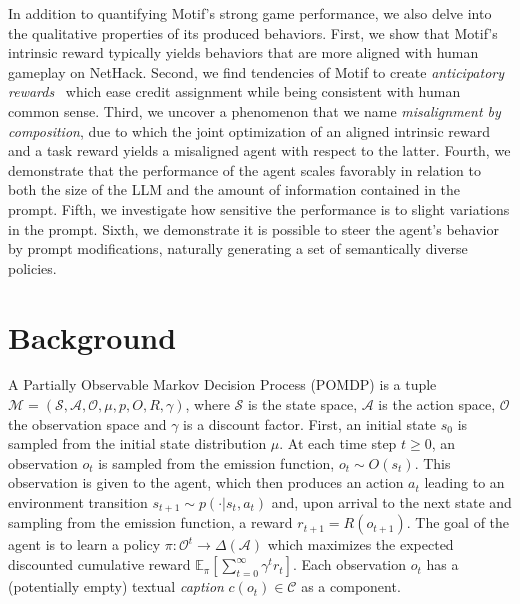 \documentclass{article} %
\begin{document}
In addition to quantifying Motif's strong game performance,
we also delve into the qualitative properties of its produced behaviors.
First, we show that Motif's intrinsic reward typically yields behaviors that are more aligned with human gameplay on NetHack.
Second, we find tendencies of Motif to create \emph{anticipatory rewards}~\citep{thomaz2006reinforcement,Pezzulo2008} which ease credit assignment while being consistent with human common sense.
Third, we uncover a phenomenon that we name \emph{misalignment by composition}, due to which the joint optimization of an aligned intrinsic reward and a task reward yields a misaligned agent with respect to the latter.
Fourth, we demonstrate that the performance of the agent scales favorably in relation to both the size of the LLM and the amount of information contained in the prompt. 
Fifth, we investigate how sensitive the performance is to slight variations in the prompt.
Sixth, we demonstrate it is possible to steer the agent's behavior by prompt modifications, 
naturally generating a set of semantically diverse policies.

\let\thefootnote\relax{}

\section{Background}
A Partially Observable Markov Decision Process (POMDP) \citep{Astrom1965} is a tuple $\mathcal M = (\mathcal S, \mathcal A, \mathcal O, \mu, p, O, R, \gamma)$, where $\mathcal S$ is the state space, $\mathcal A$ is the action space, $\mathcal{O}$ the observation space and $\gamma$ is a discount factor.
First, an initial state $s_0$ is sampled from the initial state distribution $\mu$. At each time step $t \geq 0$, an observation $o_t$ is sampled from the emission function, $o_t \sim O(s_t)$. This observation is given to the agent, which then produces an action $a_t$ leading to an environment transition $s_{t+1} \sim p(\cdot | s_t, a_t)$ and, upon arrival to the next state and sampling from the emission function, a reward $r_{t+1} = R(o_{t+1})$.
The goal of the agent is to learn a policy $\pi: \mathcal O^t \to \Delta ( \mathcal A ) $ which maximizes the expected discounted cumulative reward $\mathbb{E}_{\pi} [\sum_{t=0}^\infty \gamma^t r_t]$. Each observation $o_t$ has a (potentially empty) textual \emph{caption}  $c(o_t) \in \mathcal C $ as a component.
\end{document}
